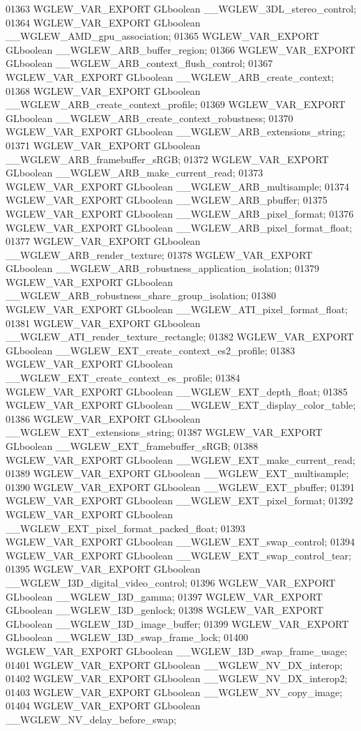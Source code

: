 \begin{DoxyCode}
01363 WGLEW_VAR_EXPORT GLboolean __WGLEW_3DL_stereo_control;
01364 WGLEW_VAR_EXPORT GLboolean __WGLEW_AMD_gpu_association;
01365 WGLEW_VAR_EXPORT GLboolean __WGLEW_ARB_buffer_region;
01366 WGLEW_VAR_EXPORT GLboolean __WGLEW_ARB_context_flush_control;
01367 WGLEW_VAR_EXPORT GLboolean __WGLEW_ARB_create_context;
01368 WGLEW_VAR_EXPORT GLboolean __WGLEW_ARB_create_context_profile;
01369 WGLEW_VAR_EXPORT GLboolean __WGLEW_ARB_create_context_robustness;
01370 WGLEW_VAR_EXPORT GLboolean __WGLEW_ARB_extensions_string;
01371 WGLEW_VAR_EXPORT GLboolean __WGLEW_ARB_framebuffer_sRGB;
01372 WGLEW_VAR_EXPORT GLboolean __WGLEW_ARB_make_current_read;
01373 WGLEW_VAR_EXPORT GLboolean __WGLEW_ARB_multisample;
01374 WGLEW_VAR_EXPORT GLboolean __WGLEW_ARB_pbuffer;
01375 WGLEW_VAR_EXPORT GLboolean __WGLEW_ARB_pixel_format;
01376 WGLEW_VAR_EXPORT GLboolean __WGLEW_ARB_pixel_format_float;
01377 WGLEW_VAR_EXPORT GLboolean __WGLEW_ARB_render_texture;
01378 WGLEW_VAR_EXPORT GLboolean __WGLEW_ARB_robustness_application_isolation;
01379 WGLEW_VAR_EXPORT GLboolean __WGLEW_ARB_robustness_share_group_isolation;
01380 WGLEW_VAR_EXPORT GLboolean __WGLEW_ATI_pixel_format_float;
01381 WGLEW_VAR_EXPORT GLboolean __WGLEW_ATI_render_texture_rectangle;
01382 WGLEW_VAR_EXPORT GLboolean __WGLEW_EXT_create_context_es2_profile;
01383 WGLEW_VAR_EXPORT GLboolean __WGLEW_EXT_create_context_es_profile;
01384 WGLEW_VAR_EXPORT GLboolean __WGLEW_EXT_depth_float;
01385 WGLEW_VAR_EXPORT GLboolean __WGLEW_EXT_display_color_table;
01386 WGLEW_VAR_EXPORT GLboolean __WGLEW_EXT_extensions_string;
01387 WGLEW_VAR_EXPORT GLboolean __WGLEW_EXT_framebuffer_sRGB;
01388 WGLEW_VAR_EXPORT GLboolean __WGLEW_EXT_make_current_read;
01389 WGLEW_VAR_EXPORT GLboolean __WGLEW_EXT_multisample;
01390 WGLEW_VAR_EXPORT GLboolean __WGLEW_EXT_pbuffer;
01391 WGLEW_VAR_EXPORT GLboolean __WGLEW_EXT_pixel_format;
01392 WGLEW_VAR_EXPORT GLboolean __WGLEW_EXT_pixel_format_packed_float;
01393 WGLEW_VAR_EXPORT GLboolean __WGLEW_EXT_swap_control;
01394 WGLEW_VAR_EXPORT GLboolean __WGLEW_EXT_swap_control_tear;
01395 WGLEW_VAR_EXPORT GLboolean __WGLEW_I3D_digital_video_control;
01396 WGLEW_VAR_EXPORT GLboolean __WGLEW_I3D_gamma;
01397 WGLEW_VAR_EXPORT GLboolean __WGLEW_I3D_genlock;
01398 WGLEW_VAR_EXPORT GLboolean __WGLEW_I3D_image_buffer;
01399 WGLEW_VAR_EXPORT GLboolean __WGLEW_I3D_swap_frame_lock;
01400 WGLEW_VAR_EXPORT GLboolean __WGLEW_I3D_swap_frame_usage;
01401 WGLEW_VAR_EXPORT GLboolean __WGLEW_NV_DX_interop;
01402 WGLEW_VAR_EXPORT GLboolean __WGLEW_NV_DX_interop2;
01403 WGLEW_VAR_EXPORT GLboolean __WGLEW_NV_copy_image;
01404 WGLEW_VAR_EXPORT GLboolean __WGLEW_NV_delay_before_swap;

\end{DoxyCode}
